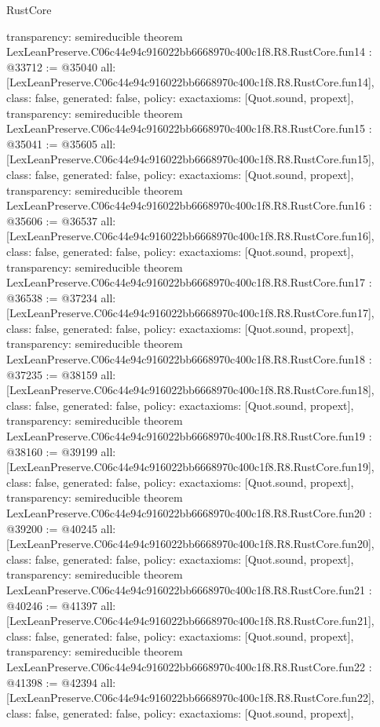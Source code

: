 \begin{lexlean}{RustCore}
\begin{coremodule}
{  transparency: semireducible
}
theorem LexLeanPreserve.C06c44e94c916022bb6668970c400c1f8.R8.RustCore.fun14 : @33712 := @35040 {
  all: [LexLeanPreserve.C06c44e94c916022bb6668970c400c1f8.R8.RustCore.fun14],
  class: false,
  generated: false,
  policy: exact{axioms: [Quot.sound, propext]},
  transparency: semireducible
}
theorem LexLeanPreserve.C06c44e94c916022bb6668970c400c1f8.R8.RustCore.fun15 : @35041 := @35605 {
  all: [LexLeanPreserve.C06c44e94c916022bb6668970c400c1f8.R8.RustCore.fun15],
  class: false,
  generated: false,
  policy: exact{axioms: [Quot.sound, propext]},
  transparency: semireducible
}
theorem LexLeanPreserve.C06c44e94c916022bb6668970c400c1f8.R8.RustCore.fun16 : @35606 := @36537 {
  all: [LexLeanPreserve.C06c44e94c916022bb6668970c400c1f8.R8.RustCore.fun16],
  class: false,
  generated: false,
  policy: exact{axioms: [Quot.sound, propext]},
  transparency: semireducible
}
theorem LexLeanPreserve.C06c44e94c916022bb6668970c400c1f8.R8.RustCore.fun17 : @36538 := @37234 {
  all: [LexLeanPreserve.C06c44e94c916022bb6668970c400c1f8.R8.RustCore.fun17],
  class: false,
  generated: false,
  policy: exact{axioms: [Quot.sound, propext]},
  transparency: semireducible
}
theorem LexLeanPreserve.C06c44e94c916022bb6668970c400c1f8.R8.RustCore.fun18 : @37235 := @38159 {
  all: [LexLeanPreserve.C06c44e94c916022bb6668970c400c1f8.R8.RustCore.fun18],
  class: false,
  generated: false,
  policy: exact{axioms: [Quot.sound, propext]},
  transparency: semireducible
}
theorem LexLeanPreserve.C06c44e94c916022bb6668970c400c1f8.R8.RustCore.fun19 : @38160 := @39199 {
  all: [LexLeanPreserve.C06c44e94c916022bb6668970c400c1f8.R8.RustCore.fun19],
  class: false,
  generated: false,
  policy: exact{axioms: [Quot.sound, propext]},
  transparency: semireducible
}
theorem LexLeanPreserve.C06c44e94c916022bb6668970c400c1f8.R8.RustCore.fun20 : @39200 := @40245 {
  all: [LexLeanPreserve.C06c44e94c916022bb6668970c400c1f8.R8.RustCore.fun20],
  class: false,
  generated: false,
  policy: exact{axioms: [Quot.sound, propext]},
  transparency: semireducible
}
theorem LexLeanPreserve.C06c44e94c916022bb6668970c400c1f8.R8.RustCore.fun21 : @40246 := @41397 {
  all: [LexLeanPreserve.C06c44e94c916022bb6668970c400c1f8.R8.RustCore.fun21],
  class: false,
  generated: false,
  policy: exact{axioms: [Quot.sound, propext]},
  transparency: semireducible
}
theorem LexLeanPreserve.C06c44e94c916022bb6668970c400c1f8.R8.RustCore.fun22 : @41398 := @42394 {
  all: [LexLeanPreserve.C06c44e94c916022bb6668970c400c1f8.R8.RustCore.fun22],
  class: false,
  generated: false,
  policy: exact{axioms: [Quot.sound, propext]},
}
\end{coremodule}
\end{lexlean}
